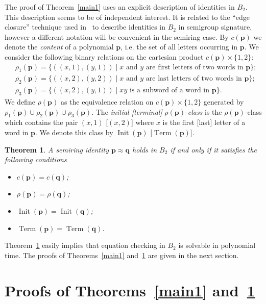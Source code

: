 \documentclass[12pt,draft]{amsart}
\newtheorem{theorem}{Theorem}
\DeclareMathOperator{\init}{Init}
\DeclareMathOperator{\term}{Term}
\begin{document}
The proof of Theorem~\ref{main1} uses an explicit description of identities in $B_2$. This description seems to be of independent interest. It is related to the ``edge closure'' technique used in~\cite{Reilly-08} to describe identities in $B_2$ in semigroup signature, however a different notation will be convenient in the semiring case. By $c(\mathbf p)$ we denote the \emph{content} of a polynomial $\mathbf p$, i.e. the set of all letters occurring in $\mathbf p$. We consider the following binary relations on the cartesian product $c(\mathbf p)\times\{1,2\}$:
\begin{align*}
&\rho_1(\mathbf p)=\{((x,1),(y,1))\mid\text{$x$ and $y$ are first letters of two words in $\mathbf p$}\};\\
&\rho_2(\mathbf p)=\{((x,2),(y,2))\mid\text{$x$ and $y$ are last letters of two words in $\mathbf p$}\};\\
&\rho_3(\mathbf p)=\{((x,2),(y,1))\mid\text{$xy$ is a subword of a word in $\mathbf p$}\}.
\end{align*}
We define $\rho(\mathbf p)$ as the equivalence relation on $c(\mathbf p)\times\{1,2\}$ generated by $\rho_1(\mathbf p)\cup\rho_2(\mathbf p)\cup\rho_3(\mathbf p)$. The \emph{initial \textup[terminal\textup]} $\rho(\mathbf p)$-\emph{class} is the $\rho(\mathbf p)$-class which contains the pair $(x,1)$ [$(x,2)$] where $x$ is the first [last] letter of a word in $\mathbf p$. We denote this class by $\init(\mathbf p)$ [$\term(\mathbf p)$].

\begin{theorem}
\label{main2} A semiring identity $\mathbf p\approx\mathbf q$ holds in $B_2$ if and only if it satisfies the following conditions
\begin{itemize}
\item[1)] $c(\mathbf p)=c(\mathbf q)$;
\item[2)] $\rho(\mathbf p)=\rho(\mathbf q)$;
\item[3)] $\init(\mathbf p)=\init(\mathbf q)$;
\item[4)] $\term(\mathbf p)=\term(\mathbf q)$.
\end{itemize}
\end{theorem}

Theorem~\ref{main2} easily implies that equation checking in $B_2$ is solvable in polynomial time. The proofs of Theorems~\ref{main1} and~\ref{main2} are given in the next section.

\section{Proofs of Theorems~\ref{main1} and~\ref{main2}}
\end{document}
